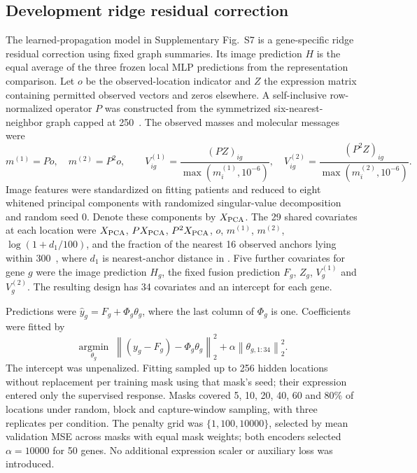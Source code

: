 \subsection{Development ridge residual correction}
The learned-propagation model in Supplementary Fig.~S7 is a gene-specific ridge residual correction using fixed graph summaries. Its image prediction $H$ is the equal average of the three frozen local MLP predictions from the representation comparison. Let $o$ be the observed-location indicator and $Z$ the expression matrix containing permitted observed vectors and zeros elsewhere. A self-inclusive row-normalized operator $P$ was constructed from the symmetrized six-nearest-neighbor graph capped at 250~\um{}. The observed masses and molecular messages were
\[
 m^{(1)}=Po,\quad m^{(2)}=P^2o,\qquad
 V^{(1)}_{ig}=\frac{(PZ)_{ig}}{\max(m^{(1)}_i,10^{-6})},\quad
 V^{(2)}_{ig}=\frac{(P^2Z)_{ig}}{\max(m^{(2)}_i,10^{-6})}.
\]
Image features were standardized on fitting patients and reduced to eight whitened principal components with randomized singular-value decomposition and random seed 0. Denote these components by $X_{\rm PCA}$. The 29 shared covariates at each location were $X_{\rm PCA}$, $PX_{\rm PCA}$, $P^2X_{\rm PCA}$, $o$, $m^{(1)}$, $m^{(2)}$, $\log(1+d_1/100)$, and the fraction of the nearest 16 observed anchors lying within 300~\um{}, where $d_1$ is nearest-anchor distance in \um{}. Five further covariates for gene $g$ were the image prediction $H_g$, the fixed fusion prediction $F_g$, $Z_g$, $V^{(1)}_g$ and $V^{(2)}_g$. The resulting design has 34 covariates and an intercept for each gene.

Predictions were $\widehat y_g=F_g+\Phi_g\theta_g$, where the last column of $\Phi_g$ is one. Coefficients were fitted by
\[
 \underset{\theta_g}{\operatorname{argmin}}\;
 \left\|(y_g-F_g)-\Phi_g\theta_g\right\|_2^2
 +\alpha\left\|\theta_{g,1:34}\right\|_2^2.
\]
The intercept was unpenalized. Fitting sampled up to 256 hidden locations without replacement per training mask using that mask's seed; their expression entered only the supervised response. Masks covered 5, 10, 20, 40, 60 and 80\% of locations under random, block and capture-window sampling, with three replicates per condition. The penalty grid was $\{1,100,10000\}$, selected by mean validation MSE across masks with equal mask weights; both encoders selected $\alpha=10000$ for 50 genes. No additional expression scaler or auxiliary loss was introduced.

